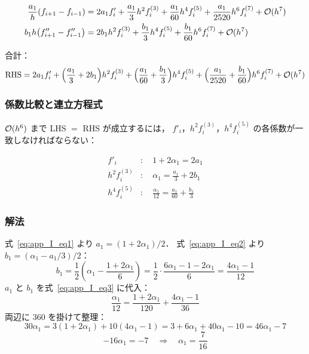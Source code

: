\begin{align}
  \frac{a_1}{h}(f_{i+1}-f_{i-1})
  &= 2a_1 f'_i + \frac{a_1}{3}h^2 f^{(3)}_i + \frac{a_1}{60}h^4 f^{(5)}_i
     + \frac{a_1}{2520}h^6 f^{(7)}_i + \mathcal{O}(h^7) \\
  b_1 h\bigl(f''_{i+1}-f''_{i-1}\bigr)
  &= 2b_1 h^2 f^{(3)}_i + \frac{b_1}{3}h^4 f^{(5)}_i
     + \frac{b_1}{60}h^6 f^{(7)}_i + \mathcal{O}(h^7)
\end{align}

合計：
\begin{equation}
  \text{RHS} = 2a_1 f'_i
  + \Bigl(\frac{a_1}{3} + 2b_1\Bigr)h^2 f^{(3)}_i
  + \Bigl(\frac{a_1}{60} + \frac{b_1}{3}\Bigr)h^4 f^{(5)}_i
  + \Bigl(\frac{a_1}{2520} + \frac{b_1}{60}\Bigr)h^6 f^{(7)}_i + \mathcal{O}(h^7)
\end{equation}

\subsubsection*{係数比較と連立方程式}

$\mathcal{O}(h^6)$ まで LHS $=$ RHS が成立するには，
$f'_i$，$h^2 f^{(3)}_i$，$h^4 f^{(5)}_i$ の各係数が一致しなければならない：

\begin{align}
  f'_i       &:\quad 1 + 2\alpha_1 = 2a_1 \label{eq:app_I_eq1} \\
  h^2 f^{(3)}_i &:\quad \alpha_1 = \frac{a_1}{3} + 2b_1 \label{eq:app_I_eq2} \\
  h^4 f^{(5)}_i &:\quad \frac{\alpha_1}{12} = \frac{a_1}{60} + \frac{b_1}{3} \label{eq:app_I_eq3}
\end{align}

\subsubsection*{解法}

式~\eqref{eq:app_I_eq1} より $a_1 = (1+2\alpha_1)/2$．
式~\eqref{eq:app_I_eq2} より $b_1 = (\alpha_1 - a_1/3)/2$：
\[
  b_1 = \frac{1}{2}\!\left(\alpha_1 - \frac{1+2\alpha_1}{6}\right)
      = \frac{1}{2}\cdot\frac{6\alpha_1 - 1 - 2\alpha_1}{6}
      = \frac{4\alpha_1 - 1}{12}
\]
$a_1$ と $b_1$ を式~\eqref{eq:app_I_eq3} に代入：
\[
  \frac{\alpha_1}{12}
  = \frac{1+2\alpha_1}{120} + \frac{4\alpha_1-1}{36}
\]
両辺に $360$ を掛けて整理：
\[
  30\alpha_1 = 3(1+2\alpha_1) + 10(4\alpha_1-1)
             = 3 + 6\alpha_1 + 40\alpha_1 - 10
             = 46\alpha_1 - 7
\]
\[
  -16\alpha_1 = -7
  \quad\Longrightarrow\quad
  \alpha_1 = \frac{7}{16}
\]

